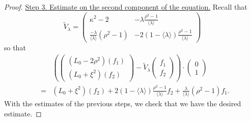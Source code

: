 \documentclass[11 pt]{amsart}
\theoremstyle{definition}
\theoremstyle{remark}
\numberwithin{equation}{section}
\begin{document}
\begin{proof}
\medskip
\noindent \underline{Step 3. Estimate on the second component of the equation.}
Recall that $$\widetilde{V}_{\lambda} = \left(\begin{array}{cc}
       \kappa^2 - 2 & - \lambda \frac{\rho^2 - 1}{\langle \lambda \rangle}\\
       \frac{- \lambda}{\langle \lambda \rangle} (\rho^2 - 1) & - 2 (1 -
       \langle \lambda \rangle) \frac{\rho^2 - 1}{\langle \lambda \rangle}
     \end{array}\right)$$ so that
  \begin{eqnarray*}
    &  & \left( \left(\begin{array}{c}
      (L_0 - 2 \rho^2) (f_1)\\
      (L_0 + \xi^2) (f_2)
    \end{array}\right) - \widetilde{V}_{\lambda} \left(\begin{array}{c}
      f_1\\
      f_2
    \end{array}\right) \right) \cdot \left(\begin{array}{c}
      0\\
      1
    \end{array}\right)\\
    & = & (L_0 + \xi^2) (f_2) + 2 (1 - \langle \lambda \rangle) \frac{\rho^2
    - 1}{\langle \lambda \rangle} f_2 + \frac{\lambda}{\langle \lambda
    \rangle} (\rho^2 - 1) f_1 .
  \end{eqnarray*}
  With the estimates of the previous steps, we check that we have the desired
  estimate.
  

\end{proof}
\end{document}
